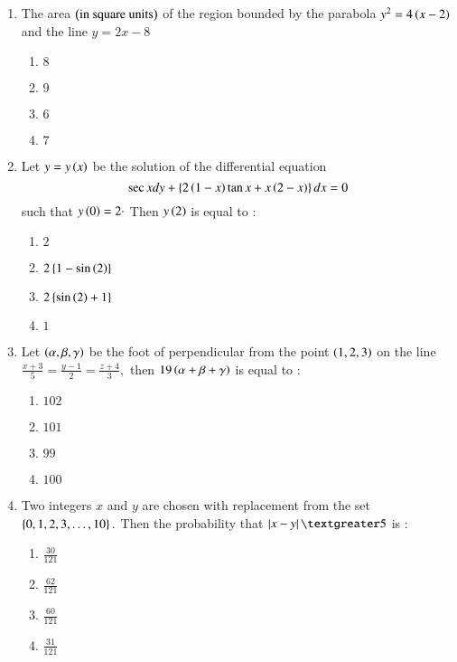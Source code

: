 \documentclass[journal,12pt,twocolumn]{IEEEtran}
\theoremstyle{remark}
\begin{document}
\begin{enumerate}
\begin{enumerate}
    \end{enumerate}
    \item The area $\left(\text{in square units}\right)$ of the region bounded by the parabola $y^2=4\left(x-2\right)$ and the line $y=2x-8$\\
    \begin{enumerate}
        \item $8$
        \item $9$
        \item $6$
        \item $7$
    \end{enumerate}
    \item Let $y=y\left(x\right)$ be the solution of the differential equation $$\sec x dy +\left\{2\left(1-x\right)\tan x +x\left(2-x\right)\right\}dx=0$$ such that $y\left(0\right)=2\cdot$ Then $y\left(2\right)$ is equal to $:$\\
    \begin{enumerate}
        \item $2$
        \item $2\left\{1-\sin{\ensuremath{\left(2\right)}}\right\}$
        \item $2\left\{\sin{\ensuremath{\left(2\right)}}+1\right\}$
        \item $1$
    \end{enumerate}
    \item Let $\left(\alpha,\beta,\gamma\right)$ be the foot of perpendicular from the point $\left(1,2,3\right)$ on the line $\frac{x+3}{5}=\frac{y-1}{2}=\frac{z+4}{3},$ then $19\left(\alpha+\beta+\gamma\right)$ is equal to $:$\\
    \begin{enumerate}
        \item $102$
        \item $101$
        \item $99$
        \item $100$
    \end{enumerate}
    \item Two integers $x$ and $y$ are chosen with replacement from the set $\left\{0,1,2,3,\dots,10\right\}.$ Then the probability that $\abs{x-y}\textgreater 5$ is $:$\\
    \begin{enumerate}
        \item $\frac{30}{121}$
        \item $\frac{62}{121}$
        \item $\frac{60}{121}$
        \item $\frac{31}{121}$
    \end{enumerate}

\end{enumerate}
\end{document}
